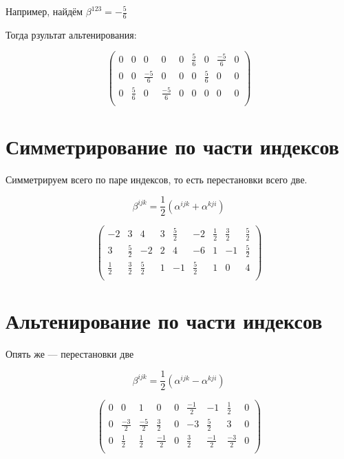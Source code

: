 \documentclass[12pt, a4paper]{article}
\newcommand\arr[2]{\left(\begin{array}{#1}#2\end{array}\right)}
\begin{document}
    Например, найдём $\beta^{123}= -\frac{5}{6}$


    Тогда рзультат альтенирования:

    \begin{equation}
        \arr{ccc|ccc|ccc}{
            0 & 0 & 0 & 0 & 0 & \frac{5}{6} & 0 & \frac{-5}{6} & 0\\
            0 & 0 & \frac{-5}{6} & 0 & 0 & 0 & \frac{5}{6} & 0 & 0\\
            0 & \frac{5}{6} & 0 & \frac{-5}{6} & 0 & 0 & 0 & 0 & 0\\
        }
    \end{equation}




    \section{Симметрирование по части индексов}

    Симметрируем всего по паре индексов, то есть перестановки всего две.
    
    \begin{equation}
        \beta^{ijk} = \frac{1}{2} \left( \alpha^{ijk} + \alpha^{kji} \right)
    \end{equation}

    \begin{equation}
        \arr{ccc|ccc|ccc}{
            -2 & 3 & 4 & 3 & \frac{5}{2} & -2 & \frac{1}{2} & \frac{3}{2} & \frac{5}{2}\\
            3 & \frac{5}{2} & -2 & 2 & 4 & -6 & 1 & -1 & \frac{5}{2}\\
            \frac{1}{2} & \frac{3}{2} & \frac{5}{2} & 1 & -1 & \frac{5}{2} & 1 & 0 & 4\\
        }
    \end{equation}


    \section{Альтенирование по части индексов}

    Опять же — перестановки две

    \begin{equation}
        \beta^{ijk} = \frac{1}{2} \left( \alpha^{ijk} - \alpha^{kji} \right)
    \end{equation}

    \begin{equation}
        \arr{ccc|ccc|ccc}{
            0 & 0 & 1 & 0 & 0 & \frac{-1}{2} & -1 & \frac{1}{2} & 0\\
            0 & \frac{-3}{2} & \frac{-5}{2} & \frac{3}{2} & 0 & -3 & \frac{5}{2} & 3 & 0\\
            0 & \frac{1}{2} & \frac{1}{2} & \frac{-1}{2} & 0 & \frac{3}{2} & \frac{-1}{2} & \frac{-3}{2} & 0\\
        }
    \end{equation}
\end{document}
